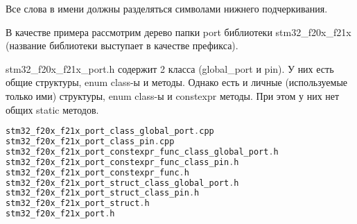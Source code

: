 \begin{enumerate}
	Все слова в имени должны разделяться символами нижнего подчеркивания. 
	
	В качестве примера рассмотрим дерево папки port библиотеки stm32\_f20x\_f21x (название библиотеки выступает в качестве префикса).
	
	stm32\_f20x\_f21x\_port.h содержит 2 класса (global\_port и pin). У них есть общие структуры, enum class-ы и методы. Однако есть и личные (используемые только ими) структуры, enum class-ы и constexpr методы. При этом у них нет общих static методов.
	\begin{lstlisting}[language=C++, frame=tlBR, basicstyle=\fontsize{10}{10}\ttfamily]
stm32_f20x_f21x_port_class_global_port.cpp
stm32_f20x_f21x_port_class_pin.cpp 
stm32_f20x_f21x_port_constexpr_func_class_global_port.h
stm32_f20x_f21x_port_constexpr_func_class_pin.h
stm32_f20x_f21x_port_constexpr_func.h
stm32_f20x_f21x_port_struct_class_global_port.h
stm32_f20x_f21x_port_struct_class_pin.h
stm32_f20x_f21x_port_struct.h
stm32_f20x_f21x_port.h\end{lstlisting}\end{enumerate}